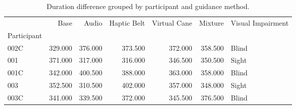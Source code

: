 
\begin{table}[!htb]
\centering
\caption{Duration difference grouped by participant and guidance method.}
\label{tab:duracao_average}
\begin{tabular}{lrrrrrl}
\toprule
{} &    Base &   Audio &  Haptic Belt &  Virtual Cane &  Mixture & Visual Impairment \\
Participant &         &         &              &               &          &                   \\
\midrule
002C        & 329.000 & 376.000 &      373.500 &       372.000 &  358.500 &             Blind \\
001         & 371.000 & 317.000 &      316.000 &       346.500 &  350.500 &             Sight \\
001C        & 342.000 & 400.500 &      388.000 &       363.000 &  358.000 &             Blind \\
003         & 352.500 & 310.500 &      402.000 &       357.000 &  348.000 &             Sight \\
003C        & 341.000 & 339.500 &      372.000 &       345.500 &  376.500 &             Blind \\
\bottomrule
\end{tabular}
\end{table}

